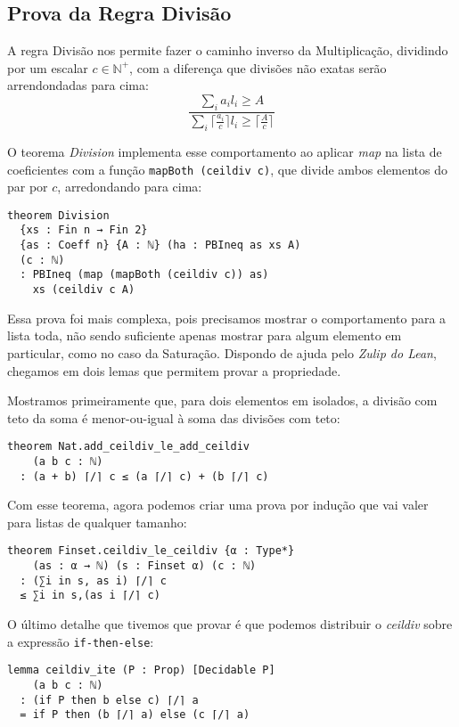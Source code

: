 \documentclass[conference]{IEEEtran}
\begin{document}
\subsection{Prova da Regra Divisão}
A regra Divisão nos permite fazer o caminho inverso da Multiplicação, dividindo por um escalar $c \in \mathbb{N}^+$, com a diferença que divisões não exatas serão arrendondadas
para cima:
\begin{equation}
    \frac
    {\sum_i{a_i l_i} \ge A}
    {\sum_i{ \lceil \frac{a_i}{c} \rceil l_i} \ge \lceil \frac{A}{c} \rceil}
\end{equation}

O teorema \textit{Division} implementa esse comportamento ao aplicar \textit{map} na lista de coeficientes com a função
\texttt{mapBoth (ceildiv c)}, que divide ambos elementos do par por $c$, arredondando para cima:
\begin{verbatim}
theorem Division
  {xs : Fin n → Fin 2}
  {as : Coeff n} {A : ℕ} (ha : PBIneq as xs A)
  (c : ℕ)
  : PBIneq (map (mapBoth (ceildiv c)) as)
    xs (ceildiv c A)
\end{verbatim}

Essa prova foi mais complexa, pois precisamos mostrar o comportamento para a lista toda,
não sendo suficiente apenas mostrar para algum elemento em particular, como no caso da Saturação.
Dispondo de ajuda pelo \textit{Zulip do Lean}, chegamos em dois lemas que permitem provar a propriedade.

Mostramos primeiramente que, para dois elementos em isolados, a divisão com teto da soma é menor-ou-igual à soma das divisões com teto:
\begin{verbatim}
theorem Nat.add_ceildiv_le_add_ceildiv
    (a b c : ℕ)
  : (a + b) ⌈/⌉ c ≤ (a ⌈/⌉ c) + (b ⌈/⌉ c) 
\end{verbatim}

Com esse teorema, agora podemos criar uma prova por indução que vai valer para listas de qualquer tamanho:
\begin{verbatim}
theorem Finset.ceildiv_le_ceildiv {α : Type*}
    (as : α → ℕ) (s : Finset α) (c : ℕ)
  : (∑i in s, as i) ⌈/⌉ c
  ≤ ∑i in s,(as i ⌈/⌉ c)
\end{verbatim}

O último detalhe que tivemos que provar é que podemos distribuir o \textit{ceildiv} sobre a expressão \texttt{if-then-else}:
\begin{verbatim}
lemma ceildiv_ite (P : Prop) [Decidable P]
    (a b c : ℕ)
  : (if P then b else c) ⌈/⌉ a
  = if P then (b ⌈/⌉ a) else (c ⌈/⌉ a)
\end{verbatim}
\end{document}
